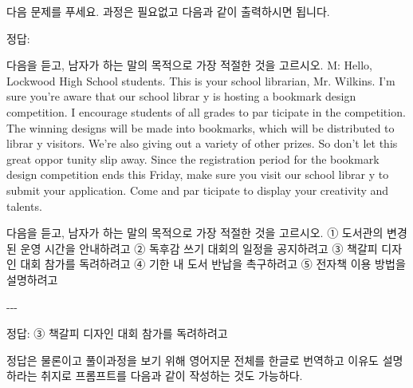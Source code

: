 \documentclass[
  letterpaper,
]{book}
\newenvironment{Shaded}{\begin{snugshade}}{\end{snugshade}}
\newcommand{\NormalTok}[1]{\textcolor[rgb]{0.00,0.23,0.31}{#1}}
\begin{document}
\begin{Shaded}
\begin{Highlighting}[]
\NormalTok{다음 문제를 푸세요. 과정은 필요없고 다음과 같이 출력하시면 됩니다.}

\NormalTok{정답:}

\NormalTok{다음을 듣고, 남자가 하는 말의 목적으로 가장 적절한 것을 고르시오.}
\NormalTok{M: Hello, Lockwood High School students. This is your school librarian, Mr. Wilkins. I’m sure you’re aware that our school librar y is hosting a bookmark design competition. I encourage students of all grades to par ticipate in the competition. The winning designs will be made into bookmarks, which will be distributed to librar y visitors. We’re also giving out a variety of other prizes. So don’t let this great oppor tunity slip away. Since the registration period for the bookmark design competition ends this Friday, make sure you visit our school librar y to submit your application. Come and par ticipate to display your creativity and talents.}

\NormalTok{다음을 듣고, 남자가 하는 말의 목적으로 가장 적절한 것을 고르시오. ① 도서관의 변경된 운영 시간을 안내하려고 ② 독후감 쓰기 대회의 일정을 공지하려고 ③ 책갈피 디자인 대회 참가를 독려하려고 ④ 기한 내 도서 반납을 촉구하려고 ⑤ 전자책 이용 방법을 설명하려고}

\NormalTok{{-}{-}{-}}

\NormalTok{정답: ③ 책갈피 디자인 대회 참가를 독려하려고}
\end{Highlighting}
\end{Shaded}

정답은 물론이고 풀이과정을 보기 위해 영어지문 전체를 한글로 번역하고
이유도 설명하라는 취지로 프롬프트를 다음과 같이 작성하는 것도 가능하다.
\end{document}
